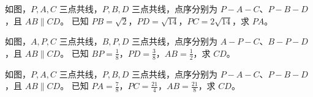 \documentclass{exam-zh}
\begin{document}

\begin{problem}[points=10]
  \noindent
  \begin{minipage}[t]{\dimexpr\linewidth-60mm-6mm\relax}
    \vspace{0pt}
    如图，$P,A,C$ 三点共线，$P,B,D$ 三点共线，点序分别为 $P-A-C$、$P-B-D$，且 $AB\parallel CD$。
已知 $PB=\sqrt{2}$，$PD=\sqrt{14}$，$PC=2\sqrt{14}$，求 $PA$。
    
  \end{minipage}\hfill
  \begin{diagramcoltikz}{60mm}{先看平行边方向，再判断 A 字型或 8 字型及对应边。}
  }
  \end{diagramcoltikz}
  \par\medskip
  \answerarea[42mm]
\end{problem}



\begin{problem}[points=10]
  \noindent
  \begin{minipage}[t]{\dimexpr\linewidth-60mm-6mm\relax}
    \vspace{0pt}
    如图，$A,P,C$ 三点共线，$B,P,D$ 三点共线，点序分别为 $A-P-C$、$B-P-D$，且 $AB\parallel CD$。
已知 $BP=\frac{1}{8}$，$PD=\frac{3}{8}$，$AB=\frac{1}{2}$，求 $CD$。
    
  \end{minipage}\hfill
  \begin{diagramcoltikz}{60mm}{先看平行边方向，再判断 A 字型或 8 字型及对应边。}
  }
  \end{diagramcoltikz}
  \par\medskip
  \answerarea[42mm]
\end{problem}



\begin{problem}[points=10]
  \noindent
  \begin{minipage}[t]{\dimexpr\linewidth-60mm-6mm\relax}
    \vspace{0pt}
    如图，$P,A,C$ 三点共线，$P,B,D$ 三点共线，点序分别为 $P-A-C$、$P-B-D$，且 $AB\parallel CD$。
已知 $PA=\frac{7}{8}$，$PC=\frac{21}{4}$，$AB=\frac{21}{8}$，求 $CD$。
    
  \end{minipage}\hfill
  \begin{diagramcoltikz}{60mm}{先看平行边方向，再判断 A 字型或 8 字型及对应边。}
  }
  \end{diagramcoltikz}
  \par\medskip
  \answerarea[42mm]
\end{problem}
\end{document}
